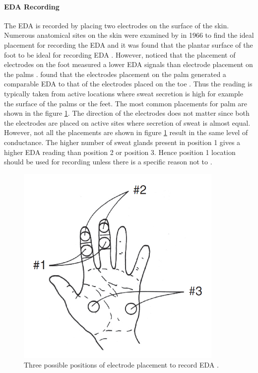\paragraph{EDA Recording} The EDA is recorded by placing two electrodes on the surface of the skin. Numerous anatomical sites on the skin were examined by \citeauthor{culp_regional_1966} in 1966 to find the ideal placement for recording the EDA and it was found that the plantar surface of the foot to be ideal for recording EDA \cite{culp_regional_1966}. However, \citeauthor{van_dooren_emotional_2012} noticed that the placement of electrodes on the foot measured a lower EDA signals than electrode placement on the palms \cite{van_dooren_emotional_2012}. \citeauthor{payne_lapses_2016} found that the electrodes placement on the palm generated a comparable EDA to that of the  electrodes placed on the toe \cite{payne_lapses_2016}. Thus the reading is typically taken from active locations where sweat secretion is high for example the surface of the palms or the feet. The most common placements for palm are shown in the figure \ref{fig:eda_electrode_placement}. The direction of the electrodes does not matter since both the electrodes are placed on active sites where secretion of sweat is almost equal. However, not all the placements are shown in figure \ref{fig:eda_electrode_placement} result in the same level of conductance. The higher number of sweat glands present in position 1 gives a higher EDA reading than position 2 or position 3. Hence position 1 location should be used for recording unless there is a specific reason not to \cite{cacioppo_electrodermal_2016_p_217_243}.

\begin{figure}
    \centering
    \includegraphics[width=100mm]{Figures/eda_electrode_placement.PNG}
    \caption{Three possible positions of electrode placement to record EDA \cite{cacioppo_electrodermal_2016_p_217_243}.}
    \label{fig:eda_electrode_placement}
\end{figure}

